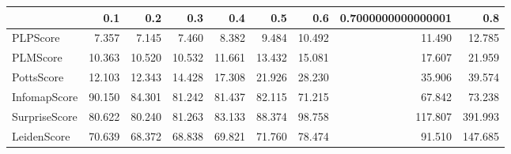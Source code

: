 \begin{tabular}{lrrrrrrrr}
\toprule
{} &    0.1 &    0.2 &    0.3 &    0.4 &    0.5 &    0.6 & 0.7000000000000001 &     0.8 \\
\midrule
PLPScore      &  7.357 &  7.145 &  7.460 &  8.382 &  9.484 & 10.492 &             11.490 &  12.785 \\
PLMScore      & 10.363 & 10.520 & 10.532 & 11.661 & 13.432 & 15.081 &             17.607 &  21.959 \\
PottsScore    & 12.103 & 12.343 & 14.428 & 17.308 & 21.926 & 28.230 &             35.906 &  39.574 \\
InfomapScore  & 90.150 & 84.301 & 81.242 & 81.437 & 82.115 & 71.215 &             67.842 &  73.238 \\
SurpriseScore & 80.622 & 80.240 & 81.263 & 83.133 & 88.374 & 98.758 &            117.807 & 391.993 \\
LeidenScore   & 70.639 & 68.372 & 68.838 & 69.821 & 71.760 & 78.474 &             91.510 & 147.685 \\
\bottomrule
\end{tabular}
